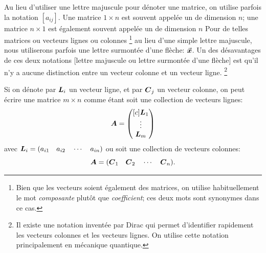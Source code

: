 Au lieu d'utiliser une lettre majuscule pour dénoter une matrice, on utilise parfois
la notation $[a_{ij}]$.
Une matrice $1 \times n$ est souvent appelée un  de dimension $n$;
une matrice $n \times 1$ est également souvent appelée un  de dimension $n$
Pour de telles matrices ou vecteurs lignes ou colonnes%
\footnote{Bien que les vecteurs soient également des matrices, 
on utilise habituellement le mot \textit{composante} plutôt que \textit{coefficient}; ces deux mots sont synonymes dans ce cas.}
 au lieu d'une simple lettre majuscule, nous utiliserons parfois une lettre surmontée d'une flèche: $\vec{\boldsymbol{x}}$. Un des désavantages de ces deux notations [lettre majuscule ou lettre surmontée d'une flèche] est qu'il n'y a aucune distinction entre un vecteur colonne et un vecteur ligne.
\footnote{Il existe une notation inventée par Dirac qui permet d'identifier rapidement les vecteurs colonnes et les vecteurs lignes.
On utilise cette notation principalement en mécanique quantique.}

Si on dénote par $\boldsymbol{L}_i$ un vecteur ligne, et par $\boldsymbol{C}_j$ un vecteur colonne, on peut écrire une matrice $m\times n$ comme
étant soit une collection de vecteurs lignes:
\[
\boldsymbol{A} = \begin{pmatrix}[c]\boldsymbol{L}_1 \\ \vdots \\ \boldsymbol{L}_m \end{pmatrix}
\]
avec $\boldsymbol{L}_i = (a_{i1}\quad a_{i2} \quad \cdots \quad a_{in})$
ou soit une collection de vecteurs colonnes:
\[
\boldsymbol{A} = (\boldsymbol{C}_1\quad \boldsymbol{C}_2 \quad \cdots \quad \boldsymbol{C}_n).
\]

